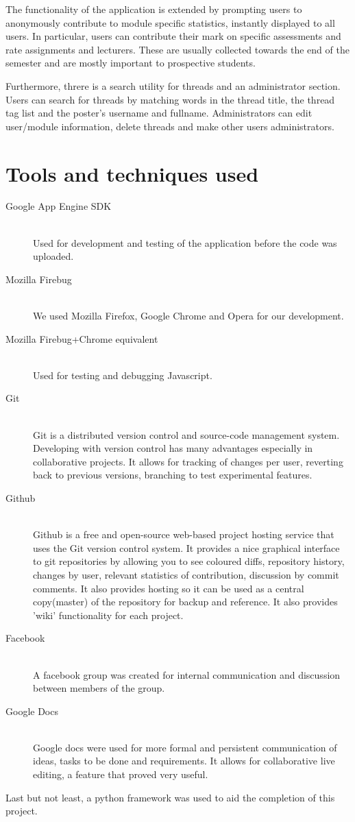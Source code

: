 \documentclass[12pt,a4paper,titlepage]{article}
\begin{document}
The functionality of the application is extended by prompting users to anonymously contribute to module specific statistics, instantly displayed to all users. In particular, users can contribute their mark on specific assessments and rate assignments and lecturers. These are usually collected towards the end of the semester and are mostly important to prospective students.

Furthermore, threre is a search utility for threads and an administrator section. Users can search for threads by matching words in the thread title, the thread tag list and the poster's username and fullname. Administrators can edit user/module information, delete threads and make other users administrators.

\newpage
\section{Tools and techniques used}
 \begin{description}
 \item[Google App Engine SDK]\hfill\\
  Used for development and testing of the application before the code was uploaded.
\item[Mozilla Firebug]\hfill\\
  	We used Mozilla Firefox, Google Chrome and Opera for our development.
\item[Mozilla Firebug+Chrome equivalent]\hfill\\
  Used for testing and debugging Javascript.
  \item[Git] \hfill \\
  Git is a distributed version control and source-code management system. Developing with version control has many advantages especially in collaborative projects. It allows for tracking of changes per user, reverting back to previous versions, branching to test experimental features. 
  \item[Github] \hfill \\
  Github is a free and open-source web-based project hosting service that uses the Git version control system.  It provides a nice graphical interface to git repositories by allowing you to see coloured diffs, repository history, changes by user, relevant statistics of contribution, discussion by commit comments. It also provides hosting so it can be used as a central copy(master) of the repository for backup and reference. It also provides 'wiki' functionality for each project.
\item[Facebook] \hfill \\
  A facebook group was created for internal communication and discussion between members of the group. 
\item[Google Docs] \hfill \\
  Google docs were used for more formal and persistent communication of ideas, tasks to be done and requirements. It allows for collaborative live editing, a feature that proved very useful.
\end{description}
Last but not least, a python framework was used to aid the completion of this project. 
\end{document}
